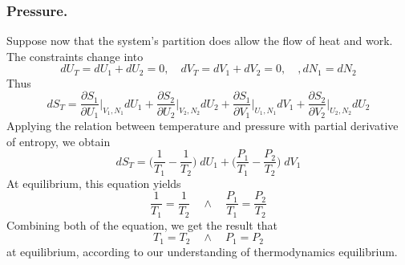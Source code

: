 \documentclass[../../../Main.tex]{subfiles}
\begin{document}
\subsubsection*{Pressure.} Suppose now that the system's partition does allow the flow of heat and work. The constraints change into
\begin{equation*}
    dU_T=dU_1+dU_2=0, \quad dV_T=dV_1 +dV_2=0, \quad, dN_1=dN_2
\end{equation*}
Thus
\begin{equation*}
    dS_T=\frac{\partial S_1}{\partial U_1}\bigg|_{V_1,N_1} dU_1 + \frac{\partial S_2}{\partial U_2}\bigg|_{V_2,N_2} dU_2  +\frac{\partial S_1}{\partial V_1}\bigg|_{U_1,N_1} dV_1 + \frac{\partial S_2}{\partial V_2}\bigg|_{U_2,N_2} dU_2
\end{equation*}
Applying the relation between temperature and pressure with partial derivative of entropy, we obtain 
\begin{equation*}
    dS_T=\biggl(\frac{1}{T_1}-\frac{1}{T_2}\biggr)\;dU_1+\biggl(\frac{P_1}{T_1}-\frac{P_2}{T_2}\biggr)\;dV_1
\end{equation*}
At equilibrium, this equation yields
\begin{equation*}
    \frac{1}{T_1}=\frac{1 }{T_2}
    \quad\land\quad
    \frac{P_1}{T_1}=\frac{P_2}{T_2}
\end{equation*}
Combining both of the equation, we get the result that
\begin{equation*}
    T_1=T_2
    \quad\land\quad
    P_1=P_2
\end{equation*}
at equilibrium, according to our understanding of thermodynamics equilibrium.
\end{document}
